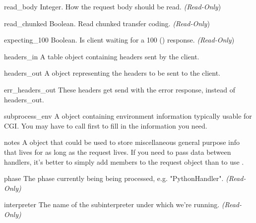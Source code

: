 \begin{memberdesc}[Request]{read_body}
Integer. How the request body should be read.
\emph{(Read-Only})
\end{memberdesc}

\begin{memberdesc}[Request]{read_chunked}
Boolean. Read chunked transfer coding.
\emph{(Read-Only})
\end{memberdesc}

\begin{memberdesc}[Request]{expecting_100}
Boolean. Is client waiting for a 100 () response.
\emph{(Read-Only})
\end{memberdesc}

\begin{memberdesc}[Request]{headers_in}
A table object containing headers sent by the client.
\end{memberdesc}

\begin{memberdesc}[Request]{headers_out}
A  object representing the headers to be sent to the
client. 
\end{memberdesc}

\begin{memberdesc}[Request]{err_headers_out}
These headers get send with the error response, instead of
headers_out.
\end{memberdesc}

\begin{memberdesc}[Request]{subprocess_env}
A  object containing environment information typically usable for CGI.
You may have to call  first to fill in the information
you need.
\end{memberdesc}

\begin{memberdesc}[Request]{notes}
A  object that could be used to store miscellaneous
general purpose info that lives for as long as the request lives. If
you need to pass data between handlers, it's better to simply add
members to the request object than to use .
\end{memberdesc}

\begin{memberdesc}[Request]{phase}
The phase currently being being processed, e.g. "PythonHandler".
\emph{(Read-Only)}
\end{memberdesc}

\begin{memberdesc}[Request]{interpreter}
The name of the subinterpreter under which we're running.
\emph{(Read-Only)}
\end{memberdesc}

